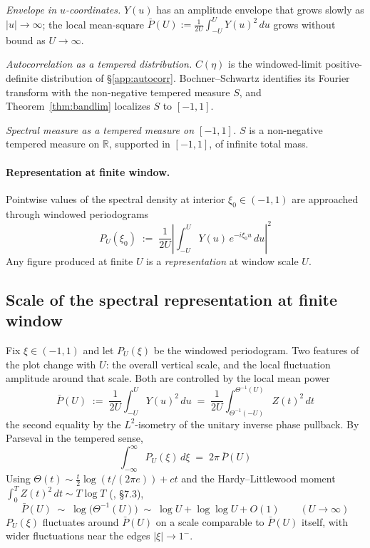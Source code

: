 \documentclass[11pt]{article}
\begin{document}
\emph{Envelope in $u$-coordinates.} $Y(u)$ has an amplitude envelope that grows slowly as $|u|\to\infty$; the local mean-square $\bar P(U):=\tfrac{1}{2U}\int_{-U}^{U}Y(u)^2\,du$ grows without bound as $U\to\infty$.

\emph{Autocorrelation as a tempered distribution.} $C(\eta)$ is the windowed-limit positive-definite distribution of \S\ref{app:autocorr}. Bochner--Schwartz identifies its Fourier transform with the non-negative tempered measure $S$, and Theorem~\ref{thm:bandlim} localizes $S$ to $[-1,1]$.

\emph{Spectral measure as a tempered measure on $[-1,1]$.} $S$ is a non-negative tempered measure on $\mathbb{R}$, supported in $[-1,1]$, of infinite total mass.

\paragraph{Representation at finite window.}
Pointwise values of the spectral density at interior $\xi_0\in(-1,1)$ are approached through windowed periodograms
\begin{equation}\label{eq:PUxi0}
P_U(\xi_0) \;:=\; \frac{1}{2U}\!\left|\int_{-U}^{U}Y(u)\,e^{-i\xi_0 u}\,du\right|^2
\end{equation}
Any figure produced at finite $U$ is a \emph{representation} at window scale $U$.

\subsection{Scale of the spectral representation at finite window}\label{app:windowscale}

Fix $\xi\in(-1,1)$ and let $P_U(\xi)$ be the windowed periodogram. Two features of the plot change with $U$: the overall vertical scale, and the local fluctuation amplitude around that scale. Both are controlled by the local mean power
\begin{equation}\label{eq:Pbardef}
\bar P(U) \;:=\; \frac{1}{2U}\int_{-U}^{U}Y(u)^2\,du \;=\; \frac{1}{2U}\int_{\Theta^{-1}(-U)}^{\Theta^{-1}(U)}\!\! Z(t)^2\,dt
\end{equation}
the second equality by the $L^2$-isometry of the unitary inverse phase pullback. By Parseval in the tempered sense,
\begin{equation}\label{eq:Parseval}
\int_{-\infty}^{\infty}P_U(\xi)\,d\xi \;=\; 2\pi\,\bar P(U)
\end{equation}
Using $\Theta(t)\sim\tfrac{t}{2}\log(t/(2\pi e))+ct$ and the Hardy--Littlewood moment $\int_0^T Z(t)^2\,dt\sim T\log T$ (\cite{Titchmarsh}, \S7.3),
\begin{equation}\label{eq:PbarAsymp}
\bar P(U) \;\sim\; \log\!\big(\Theta^{-1}(U)\big) \;\sim\; \log U + \log\log U + O(1)\qquad (U\to\infty)
\end{equation}
$P_U(\xi)$ fluctuates around $\bar P(U)$ on a scale comparable to $\bar P(U)$ itself, with wider fluctuations near the edges $|\xi|\to 1^-$.
\end{document}
